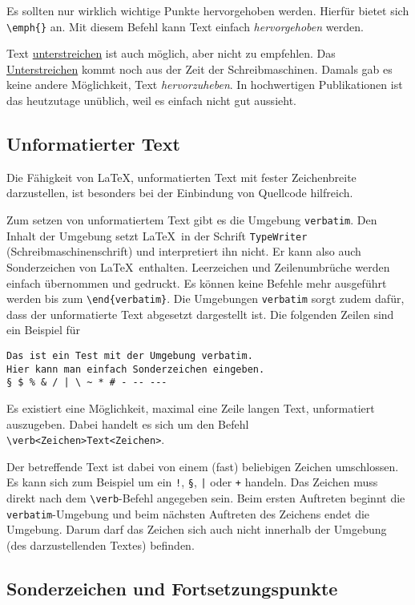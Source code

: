 \documentclass{llncs}
\begin{document}
Es sollten nur wirklich wichtige Punkte hervorgehoben werden. Hierfür bietet sich \verb!\emph{}! an. Mit diesem Befehl kann Text einfach \emph{hervorgehoben} werden.

Text \underline{unterstreichen} ist auch möglich, aber nicht zu empfehlen. Das \underline{Unterstreichen} kommt noch aus der Zeit der Schreibmaschinen. Damals gab es keine andere Möglichkeit, Text \emph{hervorzuheben}. In hochwertigen Publikationen ist das heutzutage unüblich, weil es einfach nicht gut aussieht.

\subsection{Unformatierter Text}
Die Fähigkeit von \LaTeX, unformatierten Text mit fester Zeichenbreite darzustellen, ist 
besonders bei der Einbindung von Quellcode hilfreich.

Zum setzen von unformatiertem Text gibt es die Umgebung \texttt{verbatim}. Den Inhalt der Umgebung setzt \LaTeX\ in der Schrift \texttt{TypeWriter} (Schreibmaschinenschrift) und interpretiert ihn nicht. Er kann also auch Sonderzeichen von \LaTeX\ enthalten. Leerzeichen und Zeilenumbrüche werden einfach übernommen und gedruckt. Es können keine Befehle mehr ausgeführt werden bis zum \verb!\end{verbatim}!. Die Umgebungen \texttt{verbatim} sorgt zudem dafür, dass der unformatierte Text abgesetzt dargestellt ist. Die folgenden Zeilen sind ein Beispiel für 

\begin{verbatim}
Das ist ein Test mit der Umgebung verbatim.
Hier kann man einfach Sonderzeichen eingeben.
§ $ % & / | \ ~ * # - -- ---
\end{verbatim}

Es existiert eine Möglichkeit, maximal eine Zeile langen Text, unformatiert auszugeben. Dabei handelt es sich um den Befehl \verb!\verb<Zeichen>Text<Zeichen>!.

Der betreffende Text ist dabei von einem (fast) beliebigen Zeichen umschlossen. Es kann sich zum Beispiel um ein \verb+!+, \verb!§!, \verb!|! oder \verb!+! handeln. Das Zeichen muss direkt nach dem \verb!\verb!-Befehl angegeben sein. Beim ersten Auftreten beginnt die \verb!verbatim!-Umgebung und beim nächsten Auftreten des Zeichens endet die Umgebung. Darum darf das Zeichen sich auch nicht innerhalb der Umgebung (des darzustellenden Textes) befinden.

\subsection{Sonderzeichen und Fortsetzungspunkte}
\end{document}
